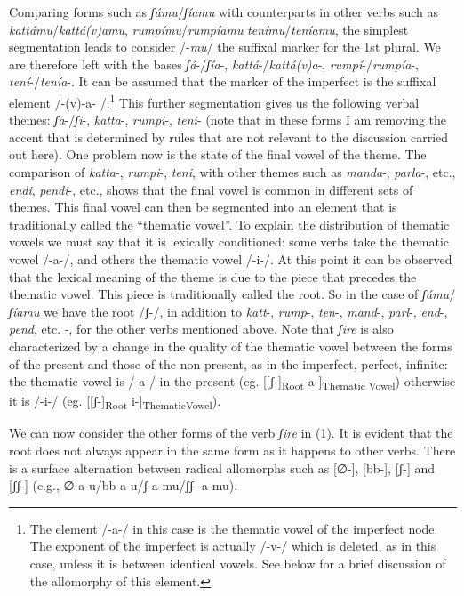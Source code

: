 \documentclass[output=paper]{langscibook}
\begin{document}
Comparing forms such as \textit{ʃámu}/\textit{ʃíamu} with counterparts in other verbs such as \textit{kattámu}/\textit{kattá(v)amu}, \textit{rumpímu}/\textit{rumpíamu} \textit{tenímu}/\textit{teníamu}, the simplest segmentation leads to consider /-\textit{mu}/ the suffixal marker for the 1st plural. We are therefore left with the bases  \textit{ʃá}-/\textit{ʃía}-, \textit{kattá}-/\textit{kattá(v)a}-, \textit{rumpí}-/\textit{rumpía}-, \textit{tení}-/\textit{tenía}-.  It can be assumed that the marker of the imperfect is  the suffixal element /-(v)-a- /.\footnote{The element /-a-/ in this case is the thematic vowel of the imperfect node.  The exponent of the imperfect is actually /-v-/ which is deleted, as in this case, unless it is between identical vowels.  See below for a brief discussion of the allomorphy of this element.} This further segmentation gives us the following verbal themes:  \textit{ʃa}-/\textit{ʃi}-, \textit{katta}-, \textit{rumpi}-, \textit{teni}-  (note that in these forms I am removing the accent that is determined by rules that are not relevant to the discussion carried out here). One problem now is the state of the final vowel of the theme. The comparison of \textit{katta}-, \textit{rumpi}-, \textit{teni}, with other themes such as \textit{manda}-, \textit{parla}-, etc., \textit{endi}, \textit{pendi}-,  etc., shows that the final vowel is common in different sets of  themes.  This final vowel can then be segmented into an element that is traditionally called  the “thematic vowel”. To explain the distribution of thematic vowels we must say that it is lexically  conditioned:  some verbs take the thematic  vowel  /-a-/, and others the thematic vowel  /-i-/. At this point it can be observed that the lexical meaning of the  theme  is  due to the piece that precedes the thematic vowel. This piece is traditionally called the root. So in the case of \textit{ʃámu}/\textit{ʃíamu}  we have the root /ʃ-/, in addition to \textit{katt}-, \textit{rump}-, \textit{ten}-, \textit{mand}-, \textit{parl}-, \textit{end}-, \textit{pend}, etc. -,  for the other verbs mentioned above.  Note that  \textit{ʃire}  is also characterized by a change in the quality of the thematic vowel between the forms of the present and those of the non-present, as in the imperfect, perfect, infinite: the thematic vowel is /-a-/ in the present  (eg. [[ʃ-]\textsubscript{Root}  a-]\textsubscript{Thematic Vowel}) otherwise it is  /-i-/ (eg. [[ʃ-]\textsubscript{Root}  i-]\textsubscript{ThematicVowel}).

We can now consider the other forms of the verb \textit{ʃire}  in  (1).  It is evident that the root does not always appear in the same form as it happens to other verbs.  There is a surface alternation between radical allomorphs such as  [∅-], [bb-], [ʃ-]  and  [ʃʃ-]  (e.g.,  ∅-a-u/bb-a-u/ʃ-a-mu/ʃʃ -a-mu).  
\end{document}
